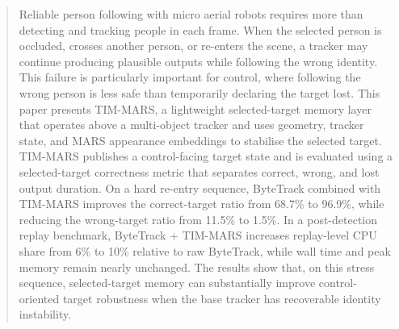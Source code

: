 \begin{abstract}
Reliable person following with micro aerial robots requires more than detecting and tracking people in each frame. When the selected person is occluded, crosses another person, or re-enters the scene, a tracker may continue producing plausible outputs while following the wrong identity. This failure is particularly important for control, where following the wrong person is less safe than temporarily declaring the target lost. This paper presents TIM-MARS, a lightweight selected-target memory layer that operates above a multi-object tracker and uses geometry, tracker state, and MARS appearance embeddings to stabilise the selected target. TIM-MARS publishes a control-facing target state and is evaluated using a selected-target correctness metric that separates correct, wrong, and lost output duration. On a hard re-entry sequence, ByteTrack combined with TIM-MARS improves the correct-target ratio from 68.7\% to 96.9\%, while reducing the wrong-target ratio from 11.5\% to 1.5\%. In a post-detection replay benchmark, ByteTrack + TIM-MARS increases replay-level CPU share from 6\% to 10\% relative to raw ByteTrack, while wall time and peak memory remain nearly unchanged. The results show that, on this stress sequence, selected-target memory can substantially improve control-oriented target robustness when the base tracker has recoverable identity instability.
\end{abstract}
